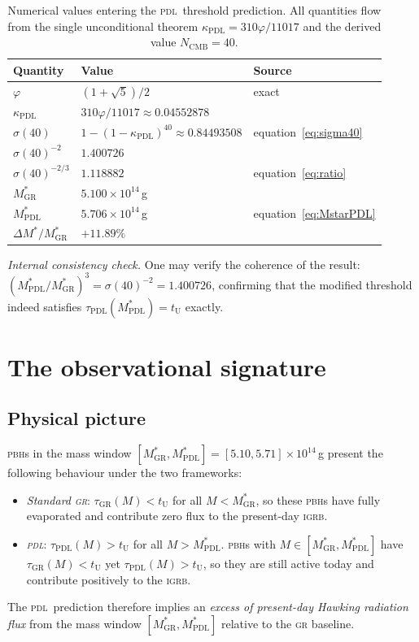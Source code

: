 \documentclass[12pt, a4paper]{article}
\theoremstyle{definition}
\newcommand{\PDL}{\textsc{pdl}}
\newcommand{\kappaPDL}{\kappa_{\mathrm{PDL}}}
\newcommand{\Mstar}{M^{*}}
\newcommand{\MstarGR}{M^{*}_{\mathrm{GR}}}
\newcommand{\MstarPDL}{M^{*}_{\mathrm{PDL}}}
\newcommand{\tU}{t_{\mathrm{U}}}
\newcommand{\NCMB}{N_{\mathrm{CMB}}}
\newcommand{\phigold}{\varphi}
\begin{document}
\begin{table}[h]
\centering
\begin{tabular}{lll}
\toprule
\textbf{Quantity} & \textbf{Value} & \textbf{Source} \\
\midrule
$\phigold$ & $(1+\sqrt{5})/2$ & exact \\
$\kappaPDL$ & $310\phigold/11017 \approx 0.04552878$ & \cite{D42} \\
$\sigma(40)$ & $1-(1-\kappaPDL)^{40} \approx 0.84493508$ & equation~\eqref{eq:sigma40} \\
$\sigma(40)^{-2}$ & $1.400726$ & \\
$\sigma(40)^{-2/3}$ & $1.118882$ & equation~\eqref{eq:ratio} \\
$\MstarGR$ & $5.100\times10^{14}$\,g & \cite{MacGibbon1991,Carr2021} \\
$\MstarPDL$ & $5.706\times10^{14}$\,g & equation~\eqref{eq:MstarPDL} \\
$\Delta\Mstar / \MstarGR$ & $+11.89\%$ & \\
\bottomrule
\end{tabular}
\caption{Numerical values entering the \PDL\ threshold prediction. All quantities flow from the single unconditional theorem $\kappaPDL = 310\phigold/11017$ and the derived value $\NCMB = 40$.}
\label{tab:numerics}
\end{table}

\textit{Internal consistency check.} One may verify the coherence of the result: $(\MstarPDL/\MstarGR)^3 = \sigma(40)^{-2} = 1.400726$, confirming that the modified threshold indeed satisfies $\tau_{\mathrm{PDL}}(\MstarPDL) = \tU$ exactly.

\section{The observational signature}

\subsection{Physical picture}

\textsc{pbh}s in the mass window $[\MstarGR, \MstarPDL] = [5.10, 5.71]\times10^{14}$\,g present the following behaviour under the two frameworks:
\begin{itemize}
  \item \emph{Standard \textsc{gr}}: $\tau_{\mathrm{GR}}(M) < \tU$ for all $M < \MstarGR$, so these \textsc{pbh}s have fully evaporated and contribute zero flux to the present-day \textsc{igrb}.
  \item \emph{\PDL}: $\tau_{\mathrm{PDL}}(M) > \tU$ for all $M > \MstarPDL$. \textsc{pbh}s with $M \in [\MstarGR, \MstarPDL]$ have $\tau_{\mathrm{GR}}(M) < \tU$ yet $\tau_{\mathrm{PDL}}(M) > \tU$, so they are still active today and contribute positively to the \textsc{igrb}.
\end{itemize}
The \PDL\ prediction therefore implies an \emph{excess of present-day Hawking radiation flux} from the mass window $[\MstarGR, \MstarPDL]$ relative to the \textsc{gr} baseline.
\end{document}
